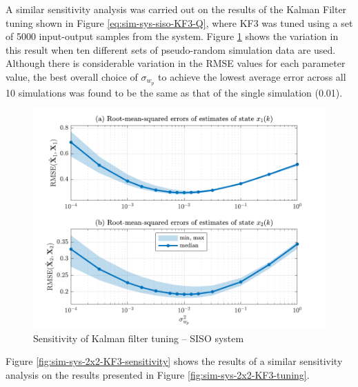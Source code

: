 A similar sensitivity analysis was carried out on the results of the Kalman Filter tuning shown in Figure \ref{eq:sim-sys-siso-KF3-Q}, where KF3 was tuned using a set of 5000 input-output samples from the system. Figure \ref{fig:sim-sys-siso-KF3-sensitivity} shows the variation in this result when ten different sets of pseudo-random simulation data are used.  Although there is considerable variation in the RMSE values for each parameter value, the best overall choice of $\sigma_{w_p}$ to achieve the lowest average error across all 10 simulations was found to be the same as that of the single simulation (0.01).

\begin{figure}[htp]
	\centering
	\includegraphics[width=14cm]{images/rod_obs_sim1_3KF_Q_statplot.pdf}
	\caption{Sensitivity of Kalman filter tuning – SISO system}
	\label{fig:sim-sys-siso-KF3-sensitivity}
\end{figure}

Figure \ref{fig:sim-sys-2x2-KF3-sensitivity} shows the results of a similar sensitivity analysis on the results presented in Figure \ref{fig:sim-sys-2x2-KF3-tuning}.

